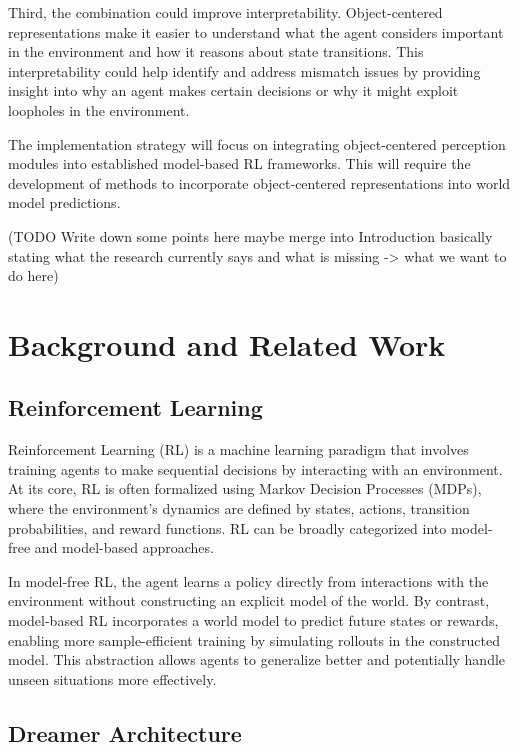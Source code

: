 \documentclass[
	english,
	ruledheaders=section,
	class=report,
	thesis={type=master},
	accentcolor=9c,
	custommargins=true,
	marginpar=false,
	parskip=half-,
	fontsize=11pt,
]{tudapub}
\begin{document}
Third, the combination could improve interpretability. Object-centered representations make it easier to understand what the agent considers important in the environment and how it reasons 
about state transitions. This interpretability could help identify and address mismatch issues by providing insight into why an agent makes certain decisions or why it might exploit loopholes in the environment.

The implementation strategy will focus on integrating object-centered perception modules into established model-based RL frameworks. This will require the development of methods to incorporate
 object-centered representations into world model predictions.

(TODO Write down some points here maybe merge into Introduction basically stating what the research currently says and what is missing -> what we want to do here)

\chapter{Background and Related Work}
\label{chap:background}

\section{Reinforcement Learning}
\label{sec:reinforcement_learning}

Reinforcement Learning (RL) is a machine learning paradigm that involves training agents to make sequential 
decisions by interacting with an environment. At its core, RL is often formalized using Markov Decision Processes
 (MDPs), where the environment's dynamics are defined by states, actions, transition probabilities, and reward
 functions. RL can be broadly categorized into model-free and model-based approaches.

In model-free RL, the agent learns a policy directly from interactions with the environment without
 constructing an explicit model of the world. By contrast, model-based RL incorporates a world model 
 to predict future states or rewards, enabling more sample-efficient training by simulating rollouts
  in the constructed model. This abstraction allows agents to generalize better and potentially handle unseen
   situations more effectively.

\section{Dreamer Architecture}
\label{sec:dreamer_architecture}
\end{document}
